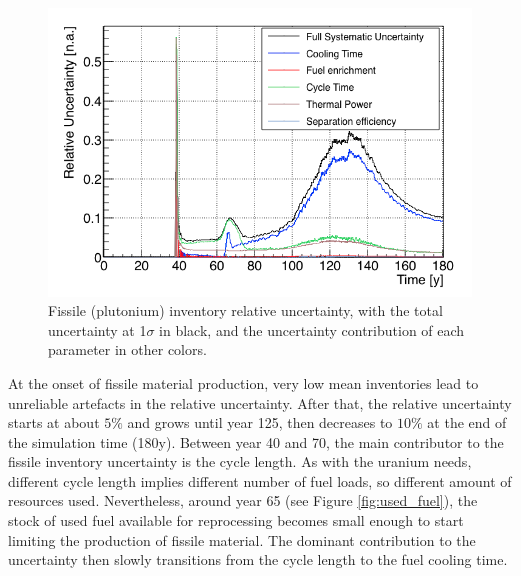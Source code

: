 \documentclass{anstrans}
\begin{document}
\begin{figure}[t] %
    \centering
    \includegraphics[scale=0.3]{pu_uncer}
    \caption{Fissile (plutonium) inventory relative uncertainty, with
    the total uncertainty at 1$\sigma$ in black, and the uncertainty
    contribution of each parameter in other colors.}\label{fig:pu_uncer}
\end{figure}

At the onset of fissile material production, very low mean inventories lead to
unreliable artefacts in the relative uncertainty.
After that, the relative uncertainty
starts at about $5\%$ and grows until year
125, then decreases to $10\%$ at the end of the simulation time (180y).  
Between year 40 and 70, the main contributor to the fissile inventory
uncertainty is the cycle length.  As with the uranium needs, different cycle length
implies different number of fuel loads, so different amount of resources used.  Nevertheless, around year 65 (see Figure
\ref{fig:used_fuel}), the stock of used fuel available for reprocessing becomes
small enough to start limiting the production of fissile material.
The dominant contribution to the uncertainty then slowly transitions from
the cycle length to the fuel cooling time.
\end{document}
